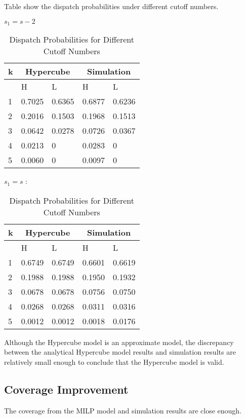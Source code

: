 \documentclass{article}
\begin{document}
Table show the dispatch probabilities under different cutoff numbers. 

\begin{table}
\centering
$s_1=s-2$\\
\begin{tabular}{l l l l l}
\hline
\hline
k& \multicolumn{2}{c}{Hypercube} & \multicolumn{2}{c}{Simulation} \\
\hline
 & H      &     L  & H      & L      \\
 \hline
1& 0.7025 & 0.6365 & 0.6877 & 0.6236 \\
2& 0.2016 & 0.1503 & 0.1968 & 0.1513 \\
3& 0.0642 & 0.0278 & 0.0726 & 0.0367 \\
4& 0.0213 & 0      & 0.0283 & 0      \\
5& 0.0060 & 0      & 0.0097 & 0      \\
\hline
\end{tabular}

$s_1=s$  :\\
\begin{tabular}{l l l l l}
\hline
\hline
k& \multicolumn{2}{c}{Hypercube} & \multicolumn{2}{c}{Simulation} \\
\hline
 & H      &     L  & H      & L      \\
 \hline
1& 0.6749 & 0.6749 & 0.6601 & 0.6619  \\
2& 0.1988 & 0.1988 & 0.1950 & 0.1932 \\
3& 0.0678 & 0.0678 & 0.0756 & 0.0750 \\
4& 0.0268 & 0.0268 & 0.0311 & 0.0316      \\
5& 0.0012 & 0.0012 & 0.0018 & 0.0176      \\
\hline
\end{tabular}
\label{table:dispatchprob}
\caption{Dispatch Probabilities for Different Cutoff Numbers}
\end{table}


Although the Hypercube model is an approximate model, the discrepancy between the analytical Hypercube model results and simulation results are relatively small enough to conclude that the Hypercube model is valid.

\subsection{Coverage Improvement}

The coverage from the MILP model and simulation results are close enough.



%
\end{document}
